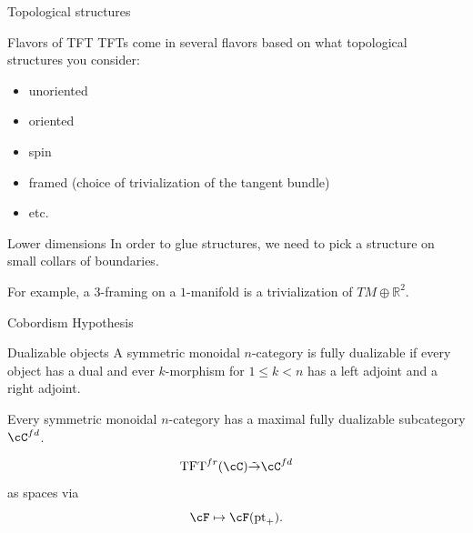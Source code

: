 \documentclass[beamer]{beamer}
\begin{document}
\begin{frame}{Topological structures}

\begin{block}{Flavors of TFT}
TFTs come in several flavors based on what topological structures you consider:
\begin{itemize}
\item unoriented
\item oriented
\item spin
\item framed (choice of trivialization of the tangent bundle)
\item etc.
\end{itemize}
\end{block}

\begin{block}{Lower dimensions}
In order to glue structures, we need to pick a structure on small collars of boundaries.

For example, a $3$-framing on a $1$-manifold is a trivialization of $TM \oplus \mathbb{R}^2$.
\end{block}

\end{frame}

\begin{frame}{Cobordism Hypothesis}

\begin{block}{Dualizable objects}
A symmetric monoidal $n$-category is fully dualizable if every object has a dual and ever $k$-morphism for $1 \leq k < n$ has a left adjoint and a right adjoint.  
\newline

Every symmetric monoidal $n$-category has a maximal fully dualizable subcategory $\cC^{fd}$.
\end{block}

\begin{theorem}
$$\mathrm{TFT}^{fr}(\cC) \tilde{\rightarrow} \cC^{fd}$$ as spaces via $$\cF \mapsto \cF(\mathrm{pt}_+).$$
\end{theorem}
\end{frame}
\end{document}
